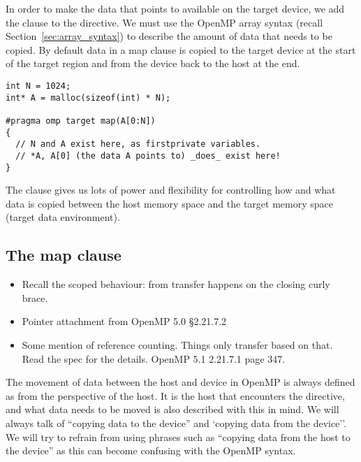 In order to make the data that  points to available on the target device, we add the  clause to the  directive.
We must use the OpenMP array syntax (recall Section~\ref{sec:array_syntax}) to describe the amount of data that needs to be copied.
By default data in a map clause is copied to the target device at the start of the target region and from the device back to the host at the end.

\begin{Verbatim}
int N = 1024;
int* A = malloc(sizeof(int) * N);

#pragma omp target map(A[0:N])
{
  // N and A exist here, as firstprivate variables.
  // *A, A[0] (the data A points to) _does_ exist here!
}
\end{Verbatim}

The  clause gives us lots of power and flexibility for controlling how and what data is copied between the host memory space and the target memory space (target data environment).

\subsection{The map clause}
\label{ssec:map_clause}

\begin{itemize}
  \item Recall the scoped behaviour: from transfer happens on the closing curly brace.
  \item Pointer attachment from OpenMP 5.0 §2.21.7.2
  \item Some mention of reference counting. Things only transfer based on that. Read the spec for the details. OpenMP 5.1 2.21.7.1 page 347.
\end{itemize}

The movement of data between the host and device in OpenMP is always defined as from the perspective of the host.
It is the host that encounters the  directive, and what data needs to be moved is also described with this in mind.
We will always talk of ``copying data to the device'' and `copying data from the device''.
We will try to refrain from using phrases such as ``copying data from the host to the device'' as this can become confusing with the OpenMP syntax.


